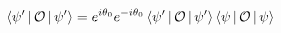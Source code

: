 \documentclass[preview]{standalone}
\begin{document}
\begin{align*}
\Braket{\psi '|\mathcal{O}|\psi '} = e^{i \theta_0}e^{-i \theta_0}\Braket{\psi ' |\mathcal{O}|\psi '} \Braket{\psi|\mathcal{O}|\psi}
\end{align*}
\end{document}
